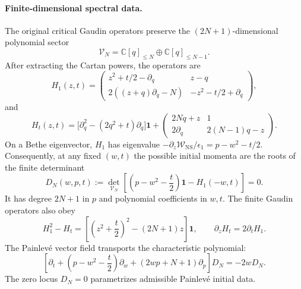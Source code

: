 \documentclass[a4paper,11pt]{article}
\numberwithin{equation}{section}
\begin{document}
\paragraph*{Finite-dimensional spectral data.}
The original critical Gaudin operators preserve the
$(2N+1)$-dimensional polynomial sector
\begin{equation}
	\mathcal{V}_{N}=\mathbb{C}[q]_{\le N}\oplus\mathbb{C}[q]_{\le N-1}.
\end{equation}
After extracting the Cartan powers, the operators are
\begin{equation}
	\label{equation:PII Langlands finite critical position operator}
	H_{1}(z,t)=\begin{pmatrix}
		z^{2}+t/2-\partial_{q}&z-q\\
		2((z+q)\partial_{q}-N)&-z^{2}-t/2+\partial_{q}
	\end{pmatrix},
\end{equation}
and
\begin{equation}
	\label{equation:PII Langlands unscaled finite time operator}
	H_{t}(z,t)=\bigl[\partial_{q}^{2}-(2q^{2}+t)\partial_{q}\bigr]\mathbf{1}
	+\begin{pmatrix}2Nq+z&1\\2\partial_{q}&2(N-1)q-z\end{pmatrix}.
\end{equation}
On a Bethe eigenvector, $H_{1}$ has eigenvalue
$-\partial_{z}\mathcal{W}_{\mathrm{NS}}/\epsilon_{1}
=p-w^{2}-t/2$.  Consequently, at any fixed $(w,t)$ the
possible initial momenta are the roots of the finite determinant
\begin{equation}
	\label{equation:PII Langlands general invariant determinant}
	D_{N}(w,p,t):=
	\det_{\mathcal{V}_{N}}\!\left[
	\left(p-w^{2}-\frac{t}{2}\right)\mathbf{1}-H_{1}(-w,t)
	\right]=0.
\end{equation}
It has degree $2N+1$ in $p$ and polynomial coefficients in $w,t$.
The finite Gaudin operators also obey
\begin{equation}
	\label{equation:PII Langlands finite critical quadratic identity}
	H_{1}^{2}-H_{t}
	=\left[\left(z^{2}+\frac{t}{2}\right)^{2}-(2N+1)z\right]\mathbf{1},
	\qquad\partial_{z} H_{t}=2\partial_{t} H_{1}.
\end{equation}
The Painlev\'e vector field transports the characteristic polynomial:
\begin{equation}
	\label{equation:PII Langlands general invariant polynomial flow}
	\left[\partial_{t}+
	\left(p-w^{2}-\frac{t}{2}\right)\partial_{w}
	+(2wp+N+1)\partial_{p}\right]D_{N}=-2wD_{N}.
\end{equation}
The zero locus $D_{N}=0$ parametrizes admissible Painlev\'e initial data.
\end{document}
